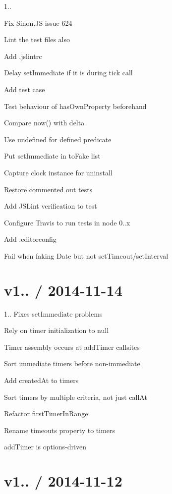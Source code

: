 \begin{DoxyItemize}
\item 1..
\item Fix Sinon.\+JS issue 624
\item Lint the test files also
\item Add .jslintrc
\item Delay set\+Immediate if it is during tick call
\item Add test case
\item Test behaviour of has\+Own\+Property beforehand
\item Compare now() with delta
\item Use undefined for defined predicate
\item Put set\+Immediate in to\+Fake list
\item Capture clock instance for uninstall
\item Restore commented out tests
\item Add J\+S\+Lint verification to test
\item Configure Travis to run tests in node 0..\+x
\item Add .editorconfig
\item Fail when faking Date but not set\+Timeout/set\+Interval
\end{DoxyItemize}

\section*{v1.. / 2014-\/11-\/14 }


\begin{DoxyItemize}
\item 1.. Fixes set\+Immediate problems
\item Rely on {\ttfamily timer} initialization to null
\item Timer assembly occurs at add\+Timer callsites
\item Sort immediate timers before non-\/immediate
\item Add created\+At to timers
\item Sort timers by multiple criteria, not just call\+At
\item Refactor first\+Timer\+In\+Range
\item Rename {\ttfamily timeouts} property to {\ttfamily timers}
\item add\+Timer is options-\/driven
\end{DoxyItemize}

\section*{v1.. / 2014-\/11-\/12 }


